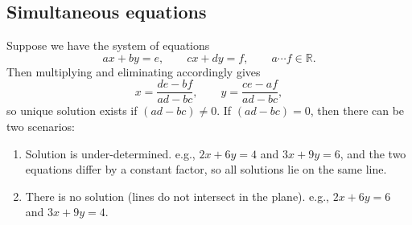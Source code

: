 \documentclass[10pt,notitlepage]{revtex4-1}
\begin{document}

\subsection{Simultaneous equations}

Suppose we have the system of equations
\begin{equation}
	ax+by=e,\qquad cx+dy=f,\qquad a\cdots f\in\mathbb{R}.
\end{equation}
Then multiplying and eliminating accordingly gives
\begin{equation}
	x=\frac{de-bf}{ad-bc},\qquad y=\frac{ce-af}{ad-bc},
\end{equation}
so unique solution exists if $(ad-bc)\neq0$. If $(ad-bc)=0$, then there can be
two scenarios:
\begin{enumerate}
	\item Solution is under-determined. e.g., $2x+6y=4$ and $3x+9y=6$, and the
	two equations differ by a constant factor, so all solutions lie on the same
	line.
	\item There is no solution (lines do not intersect in the plane). e.g.,
	$2x+6y=6$ and $3x+9y=4$.
\end{enumerate}
\end{document}
